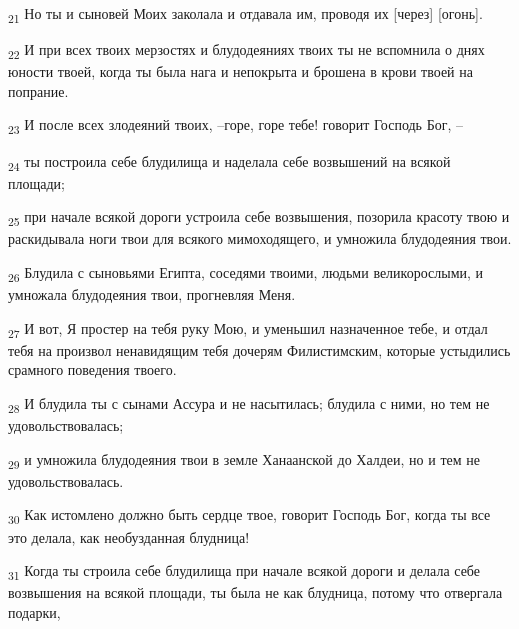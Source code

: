 \begin{tcolorbox}
\textsubscript{21} Но ты и сыновей Моих заколала и отдавала им, проводя их [через] [огонь].
\end{tcolorbox}
\begin{tcolorbox}
\textsubscript{22} И при всех твоих мерзостях и блудодеяниях твоих ты не вспомнила о днях юности твоей, когда ты была нага и непокрыта и брошена в крови твоей на попрание.
\end{tcolorbox}
\begin{tcolorbox}
\textsubscript{23} И после всех злодеяний твоих, --горе, горе тебе! говорит Господь Бог, --
\end{tcolorbox}
\begin{tcolorbox}
\textsubscript{24} ты построила себе блудилища и наделала себе возвышений на всякой площади;
\end{tcolorbox}
\begin{tcolorbox}
\textsubscript{25} при начале всякой дороги устроила себе возвышения, позорила красоту твою и раскидывала ноги твои для всякого мимоходящего, и умножила блудодеяния твои.
\end{tcolorbox}
\begin{tcolorbox}
\textsubscript{26} Блудила с сыновьями Египта, соседями твоими, людьми великорослыми, и умножала блудодеяния твои, прогневляя Меня.
\end{tcolorbox}
\begin{tcolorbox}
\textsubscript{27} И вот, Я простер на тебя руку Мою, и уменьшил назначенное тебе, и отдал тебя на произвол ненавидящим тебя дочерям Филистимским, которые устыдились срамного поведения твоего.
\end{tcolorbox}
\begin{tcolorbox}
\textsubscript{28} И блудила ты с сынами Ассура и не насытилась; блудила с ними, но тем не удовольствовалась;
\end{tcolorbox}
\begin{tcolorbox}
\textsubscript{29} и умножила блудодеяния твои в земле Ханаанской до Халдеи, но и тем не удовольствовалась.
\end{tcolorbox}
\begin{tcolorbox}
\textsubscript{30} Как истомлено должно быть сердце твое, говорит Господь Бог, когда ты все это делала, как необузданная блудница!
\end{tcolorbox}
\begin{tcolorbox}
\textsubscript{31} Когда ты строила себе блудилища при начале всякой дороги и делала себе возвышения на всякой площади, ты была не как блудница, потому что отвергала подарки,
\end{tcolorbox}
